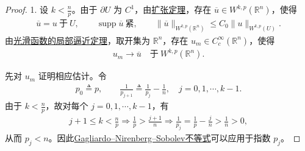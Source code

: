\documentclass[../../main.tex]{subfiles}
\begin{document}
\begin{proof}

1. 设 $k<\frac{n}{p}$。由于 $\partial U$ 为 $C^{1}$，由\hyperref[theorem:ch05-扩张定理]{扩张定理}，存在 $\overline{u}\in W^{k,p}(\mathbb{R}^{n})$，使得
\begin{align}\label{eq::jijwIIJEI9}
\overline{u}=u\ \text{于}\ U,\qquad \operatorname{supp}\overline{u}\ \text{紧},\qquad
\|\overline{u}\|_{W^{k,p}(\mathbb{R}^{n})}\leqslant C_{0}\|u\|_{W^{k,p}(U)}.
\end{align}
由\hyperref[theorem:ch05-光滑函数的局部逼近定理]{光滑函数的局部逼近定理}，取开集为 $\mathbb{R}^{n}$，存在 $u_{m}\in C_{c}^{\infty}(\mathbb{R}^{n})$，使得
\begin{align*}
u_{m}\to\overline{u}\quad\text{于}\ W^{k,p}(\mathbb{R}^{n}).
\end{align*}

先对 $u_{m}$ 证明相应估计。令
\begin{align*}
p_{0}\triangleq p,\qquad \frac{1}{p_{j+1}}\triangleq\frac{1}{p_{j}}-\frac{1}{n},\quad j=0,1,\cdots,k-1.
\end{align*}
由于 $k<\frac{n}{p}$，故对每个 $j=0,1,\cdots,k-1$，有
\begin{align*}
j+1\leqslant k<\frac{n}{p}\Longrightarrow \frac{1}{p}>\frac{j+1}{n}\Longrightarrow \frac{1}{p_j}=\frac{1}{p}-\frac{j}{n}>\frac{1}{n}>0,
\end{align*}
从而 $p_{j}<n$。因此\hyperref[theorem:Gagliardo--Nirenberg--Sobolev不等式]{Gagliardo--Nirenberg--Sobolev不等式}可以应用于指数 $p_{j}$。


\end{proof}
\end{document}
